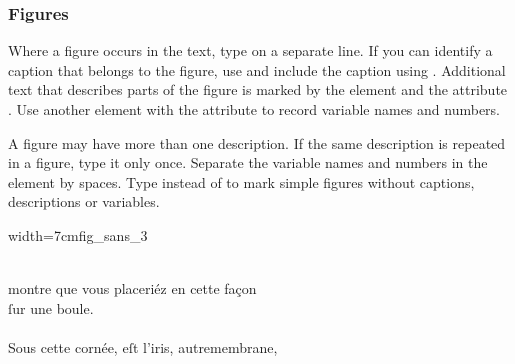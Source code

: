 \subsubsection{Figures}
\label{section figures}

\begin{mainrule}
Where a figure occurs in the text, type  on a separate line. If you can identify a caption that belongs to the figure, use  and include the caption using . Additional text that describes parts of the figure is marked by the  element and the attribute . Use another  element with the attribute  to record variable names and numbers.
\end{mainrule}

\begin{clarification}
A figure may have more than one description.
If the same description is repeated in a figure, type it only once.
Separate the variable names and numbers in the  element by spaces.
Type  instead of  to mark simple figures without captions, descriptions or variables.
\end{clarification}



\vspace{2mm}
\begin{sampleImageSmall}{width=7cm}{fig_sans_3}
\begin{typeLatin}
 \someText \\
montre que vous placeriéz en cette façon  \\
ſur une boule. \\
 \\
Sous cette cornée, eſt l'iris, autre\lwr membrane,  \\
\someText {} \\
\end{typeLatin}
\end{sampleImageSmall}

